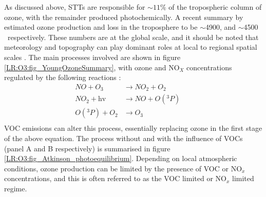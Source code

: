     As discussed above, STTs are responsible for $\sim 11\%$ of the 
    tropospheric column of ozone, with the remainder produced photochemically.
    A recent summary by \textcite{Young2018} estimated ozone production and 
    loss in the troposphere to be $\sim$4900\tgpyr, and $\sim$4500\tgpyr 
    ~respectively. 
    These numbers are at the global scale,  and it should be noted that 
    meteorology and topography can play dominant roles at local to regional 
    spatial scales \parencite[e.g.,][]{Kuang2017}.
    The main processes involved are shown in figure 
    \ref{LR:O3:fig_YoungOzoneSummary}, with ozone and NO$_X$ concentrations 
    regulated by the following reactions \parencite{Sillman1999,Atkinson2000}:
    \begin{equation}
    \begin{aligned}
    NO + O_3         & \to NO_2 + O_2      && \\%
    NO_2 + \text{hv} & \to NO + O({}^3P)   && \\%
    O({}^3P) + O_2   & \to O_3 			 && \\%
    \end{aligned}
    \label{LR:Atmos:Chem:eqn_NOandO3}
    \end{equation}
    VOC emissions can alter this process, essentially replacing ozone in the 
    first stage of the above equation.
    The process without and with the influence of VOCs (panel A and B 
    respectively) is summarised in figure 
    \ref{LR:O3:fig_Atkinson_photoequilibrium}.
    Depending on local atmospheric conditions, ozone production can be limited by the presence of VOC or NO$_x$ concentrations, and this is often referred to as the VOC limited or NO$_x$ limited regime.

    
